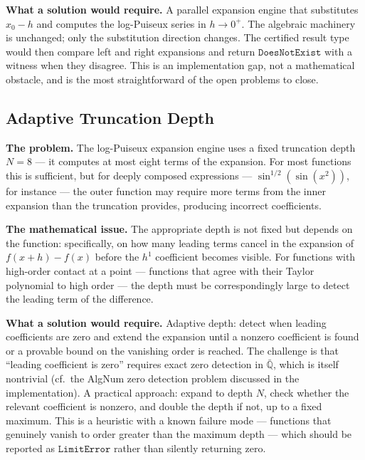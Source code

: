 \documentclass[12pt]{article}
\begin{document}
\textbf{What a solution would require.} A parallel expansion engine that
substitutes \(x_0 - h\) and computes the log-Puiseux series in
\(h \to 0^+\). The algebraic machinery is unchanged; only the
substitution direction changes. The certified result type would then
compare left and right expansions and return \(\mathtt{DoesNotExist}\)
with a witness when they disagree. This is an implementation gap, not a
mathematical obstacle, and is the most straightforward of the open
problems to close.




\subsection{Adaptive Truncation
Depth}\label{adaptive-truncation-depth}

\textbf{The problem.} The log-Puiseux expansion engine uses a fixed
truncation depth \(N = 8\) --- it computes at most eight terms of the
expansion. For most functions this is sufficient, but for deeply
composed expressions --- \(\sin^{1/2}(\sin(x^2))\), for instance --- the
outer function may require more terms from the inner expansion than the
truncation provides, producing incorrect coefficients.

\textbf{The mathematical issue.} The appropriate depth is not fixed but
depends on the function: specifically, on how many leading terms cancel
in the expansion of \(f(x+h) - f(x)\) before the \(h^1\) coefficient
becomes visible. For functions with high-order contact at a point ---
functions that agree with their Taylor polynomial to high order --- the
depth must be correspondingly large to detect the leading term of the
difference.

\textbf{What a solution would require.} Adaptive depth: detect when
leading coefficients are zero and extend the expansion until a nonzero
coefficient is found or a provable bound on the vanishing order is
reached. The challenge is that ``leading coefficient is zero'' requires
exact zero detection in \(\bar{\mathbb{Q}}\), which is itself nontrivial
(cf.~the AlgNum zero detection problem discussed in the implementation).
A practical approach: expand to depth \(N\), check whether the relevant
coefficient is nonzero, and double the depth if not, up to a fixed
maximum. This is a heuristic with a known failure mode --- functions
that genuinely vanish to order greater than the maximum depth --- which
should be reported as \(\mathtt{LimitError}\) rather than silently
returning zero.
\end{document}
